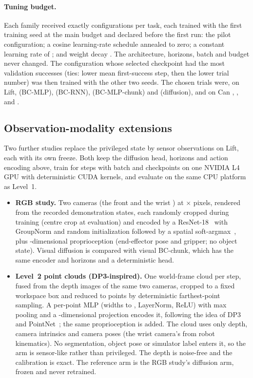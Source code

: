 \paragraph{Tuning budget.} Each family received exactly  configurations per
task, each trained with the first training seed at the main budget and declared before the first run: the
pilot configuration; a cosine learning-rate schedule annealed to zero; a constant learning
rate of ; and weight decay . The architecture, horizons, batch
and budget never changed. The configuration whose selected checkpoint had the most
validation successes (ties: lower mean first-success step, then the lower trial number) was
then trained with the other two seeds. The chosen trials were, on Lift, 
(BC-MLP),  (BC-RNN),  (BC-MLP-chunk) and
 (diffusion), and on Can ,
,  and .

\subsection{Observation-modality extensions}
Two further studies replace the privileged state by sensor observations on Lift, each with
its own freeze. Both keep the diffusion head, horizons and action encoding above, train for
 steps with batch  and  checkpoints on one NVIDIA L4
GPU with deterministic CUDA kernels, and evaluate on the same CPU platform as Level~1.
\begin{itemize}
\item \textbf{RGB study.} Two cameras (the front  and the wrist
  ) at $\times$ pixels, rendered from
  the recorded demonstration states, each randomly cropped during training (centre crop at evaluation) and encoded by a
  ResNet-18~\citep{he2016resnet} with GroupNorm and random initialization followed by a
  spatial soft-argmax~\citep{levine2016visuomotor},
  plus -dimensional proprioception (end-effector pose and gripper; no object
  state). Visual diffusion is compared with visual BC-chunk, which has the same encoder and
  horizons and a deterministic head.
\item \textbf{Level~2 point clouds (DP3-inspired).} One world-frame cloud per step, fused
  from the depth images of the same two cameras, cropped to a fixed workspace box and reduced
  to  points by deterministic farthest-point sampling. A per-point MLP
  (widths  to , LayerNorm, ReLU) with max pooling and a
  -dimensional projection encodes it, following the idea of
  DP3~\citep{ze2024dp3} and PointNet~\citep{qi2017pointnet}; the same proprioception is
  added. The cloud uses only depth, camera intrinsics and camera poses (the wrist camera's
  from robot kinematics). No segmentation, object pose or simulator label enters it, so the
  arm is sensor-like rather than privileged. The depth is noise-free and the calibration is
  exact. The reference arm is the RGB study's diffusion arm, frozen and never retrained.
\end{itemize}
